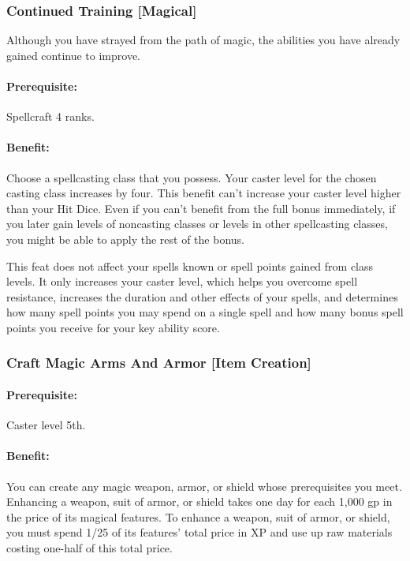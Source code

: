 \subsubsection[Continued Training]{Continued Training [Magical]}
\label{Feat:ContinuedTraining}
Although you have strayed from the path of magic, the abilities you have already gained continue to improve.

\paragraph{Prerequisite:} Spellcraft 4 ranks.

\paragraph{Benefit:} Choose a spellcasting class that you possess.
Your caster level for the chosen casting class increases by four. 
This benefit can't increase your caster level higher than your Hit Dice. 
Even if you can't benefit from the full bonus immediately, if you later gain levels of noncasting classes or levels in other spellcasting classes, you might be able to apply the rest of the bonus.

This feat does not affect your spells known or spell points gained from class levels. 
It only increases your caster level, which helps you overcome spell resistance, increases the duration and other effects of your spells, and determines how many spell points you may spend on a single spell and how many bonus spell points you receive for your key ability score.
\subsubsection[Craft Magic Arms And Armor]{Craft Magic Arms And Armor [Item Creation]}
\label{Feat:CraftMagicArmsAndArmor}
\paragraph{Prerequisite:}
Caster level 5th.

\paragraph{Benefit:} You can create any magic weapon, armor, or shield whose prerequisites you meet. Enhancing a weapon, suit of armor, or shield takes one day for each 1,000 gp in the price of its magical features. To enhance a weapon, suit of armor, or shield, you must spend 1/25 of its features’ total price in XP and use up raw materials costing one-half of this total price.

